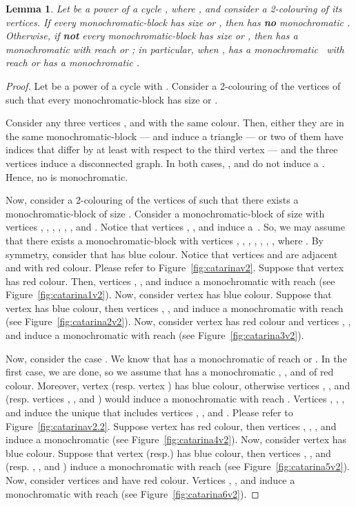 \documentclass{article}
\newtheorem{lemma}[theorem]{Lemma}
\begin{document}
\begin{lemma}
\label{l:iff}
Let  be a power of a cycle , where , and consider a
2-colouring of its vertices. If every monochromatic-block has size  or
, then  has \textbf{no} monochromatic . Otherwise, if
\textbf{not} every monochromatic-block has size  or , then  has
a monochromatic  with reach  or ; in particular, when
,  has a monochromatic~ with reach  or
 has a monochromatic .
\end{lemma}

\begin{proof}
Let  be a power of a cycle  with .
Consider a 2-colouring  of the vertices of  such that every
monochromatic-block has size  or . 

Consider any three vertices ,  and  with the
same colour. Then, either they are in the same monochromatic-block --- and
induce a triangle --- or two of them have indices that differ by at least 
with respect to the third vertex --- and the three vertices induce a
disconnected graph. In both cases, ,  and  do not induce a
. Hence, no  is monochromatic.

Now, consider a 2-colouring  of the vertices of  such that there exists
a monochromatic-block of size .
Consider a monochromatic-block of size  with vertices
, , , , , , and
.
Notice that vertices , , and  induce a~. So, we
may assume that there exists a monochromatic-block with vertices
, , , , , , ,
where . By symmetry, consider that  has blue colour. Notice that
vertices  and  are adjacent and with red colour. Please
refer to Figure~\ref{fig:catarinav2}. Suppose that vertex  has
red colour. Then, vertices , , and  induce a monochromatic
 with reach  (see Figure~\ref{fig:catarina1v2}).
Now, consider vertex  has blue colour. Suppose that vertex 
has blue colour, then vertices , , and  induce a 
monochromatic  with reach  (see Figure~\ref{fig:catarina2v2}). Now,
consider vertex  has red colour and vertices ,
, and  induce a monochromatic  with reach  (see
Figure~\ref{fig:catarina3v2}).

Now, consider the case . We know that  has a monochromatic 
of reach  or . In the first case, we are done, so we assume that 
has a monochromatic  , , and  of red colour.
Moreover, vertex  (resp. vertex ) has blue colour, otherwise
vertices , , and  (resp. vertices ,
, and ) would induce a monochromatic  with reach
. Vertices , , , and  induce the
unique  that includes vertices , , and .
Please refer to Figure~\ref{fig:catarinav2.2}.
Suppose vertex  has red colour, then vertices ,
, , and  induce a monochromatic  (see
Figure~\ref{fig:catarina4v2}).
Now, consider vertex  has blue colour. Suppose that vertex
 (resp.) has blue colour, then vertices ,
, and  (resp. , , and
) induce a monochromatic  with reach  (see
Figure~\ref{fig:catarina5v2}). Now, consider vertices  and
 have red colour. Vertices , , and
 induce a monochromatic  with reach  (see
Figure~\ref{fig:catarina6v2}).
\end{proof}
\end{document}
